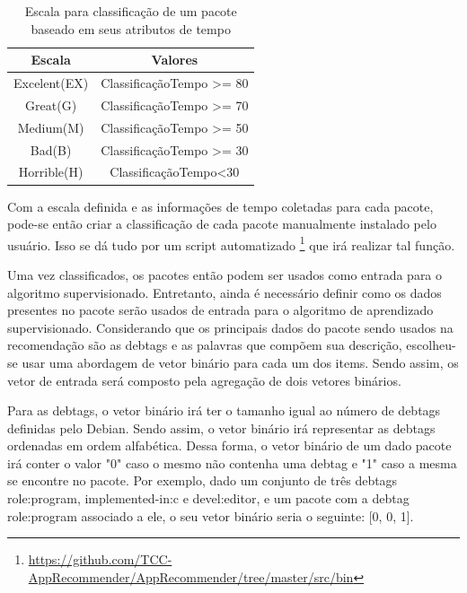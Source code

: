 \begin{table}[h]
\centering
\begin{tabular}{cc}
\hline
\rowcolor[HTML]{EFEFEF} 
{Escala} & {Valores} \\ \hline
{Excelent(EX)}  & ClassificaçãoTempo >= 80                  \\ \hline
{Great(G)}   & ClassificaçãoTempo >= 70                  \\ \hline
{Medium(M)}   & ClassificaçãoTempo >= 50                  \\ \hline
{Bad(B)}   & ClassificaçãoTempo >= 30                  \\ \hline
{Horrible(H)}   &ClassificaçãoTempo<30                   \\ \hline
\end{tabular}
\caption{Escala para classificação de um pacote baseado em seus atributos de tempo}
\label{tab:cwe476-erros}
\end{table}  


Com a escala definida e as informações de tempo coletadas para cada pacote,
pode-se então criar a classificação de cada pacote manualmente instalado pelo usuário.
Isso se dá tudo por um script automatizado \footnote{\url{https://github.com/TCC-AppRecommender/AppRecommender/tree/master/src/bin}}
que irá realizar tal função.

Uma vez classificados, os pacotes então podem ser usados como entrada para o algoritmo supervisionado.
Entretanto, ainda é necessário definir como os dados presentes no pacote serão usados de entrada para o
algoritmo de aprendizado supervisionado. Considerando que os principais dados do pacote sendo usados na
recomendação são as debtags e as palavras que compõem sua descrição, escolheu-se usar uma abordagem de
vetor binário para cada um dos items. Sendo assim, os vetor de entrada será composto pela agregação de dois vetores
binários.

Para as debtags, o vetor binário irá ter o tamanho igual ao número de debtags definidas pelo Debian. Sendo assim, o 
vetor binário irá representar as debtags ordenadas em ordem alfabética. Dessa forma,
o vetor binário de um dado pacote irá conter o valor "0" caso o mesmo não contenha uma debtag e "1" caso a mesma se encontre
no pacote. Por exemplo, dado um conjunto de três debtags role:program, implemented-in:c e devel:editor, e um pacote com a debtag
role:program associado a ele, o seu vetor binário seria o seguinte: [0, 0, 1].

